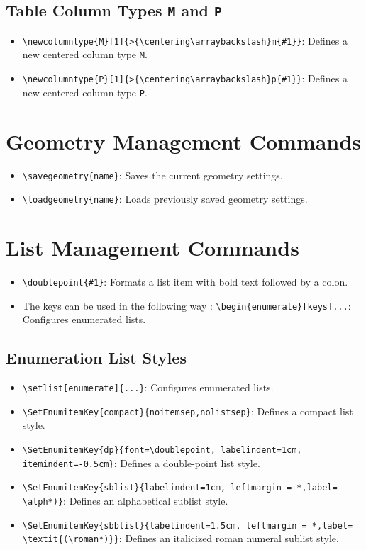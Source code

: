 \documentclass[12pt,twoside]{report}
\begin{document}
\subsection{Table Column Types \texttt{M} and \texttt{P}}
\begin{itemize}
    \item \verb|\newcolumntype{M}[1]{>{\centering\arraybackslash}m{#1}}|: Defines a new centered column type \texttt{M}.
    \item \verb|\newcolumntype{P}[1]{>{\centering\arraybackslash}p{#1}}|: Defines a new centered column type \texttt{P}.
\end{itemize}

\section{Geometry Management Commands}
\begin{itemize}
    \item \verb|\savegeometry{name}|: Saves the current geometry settings.
    \item \verb|\loadgeometry{name}|: Loads previously saved geometry settings.
\end{itemize}

\section{List Management Commands}
\begin{itemize}
    \item \verb|\doublepoint{#1}|: Formats a list item with bold text followed by a colon.
    \item The keys can be used in the following way : \verb|\begin{enumerate}[keys]...|: Configures enumerated lists.
\end{itemize}

\subsection{Enumeration List Styles}


\begin{itemize}
    \item \verb|\setlist[enumerate]{...}|: Configures enumerated lists.
    \item \verb|\SetEnumitemKey{compact}{noitemsep,nolistsep}|: Defines a compact list style.
    \item \verb|\SetEnumitemKey{dp}{font=\doublepoint, labelindent=1cm, itemindent=-0.5cm}|: Defines a double-point list style.
    \item \verb|\SetEnumitemKey{sblist}{labelindent=1cm, leftmargin = *,label= \alph*)}|: Defines an alphabetical sublist style.
    \item \verb|\SetEnumitemKey{sbblist}{labelindent=1.5cm, leftmargin = *,label= \textit{(\roman*)}}|: Defines an italicized roman numeral sublist style.
\end{itemize}
\end{document}
